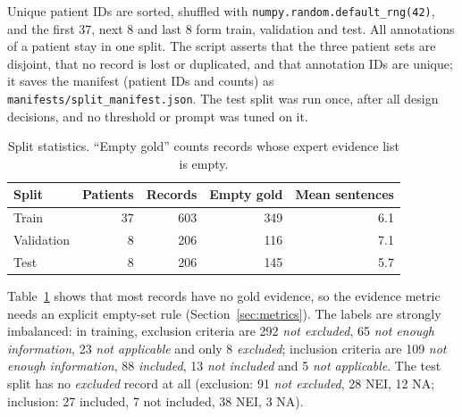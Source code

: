 \documentclass[conference]{IEEEtran}
\begin{document}
Unique patient IDs are sorted, shuffled with \texttt{numpy.random.default\_rng(42)}, and the first 37, next 8 and last 8 form train, validation and test. All annotations of a patient stay in one split. The script asserts that the three patient sets are disjoint, that no record is lost or duplicated, and that annotation IDs are unique; it saves the manifest (patient IDs and counts) as \texttt{manifests/split\_manifest.json}. The test split was run once, after all design decisions, and no threshold or prompt was tuned on it.

\begin{table}[t]
\centering\footnotesize
\caption{Split statistics. ``Empty gold'' counts records whose expert evidence list is empty.}
\label{tab:split}
\begin{tabular}{lrrrr}\toprule
Split & Patients & Records & Empty gold & Mean sentences\\\midrule
Train & 37 & 603 & 349 & 6.1\\
Validation & 8 & 206 & 116 & 7.1\\
Test & 8 & 206 & 145 & 5.7\\\bottomrule
\end{tabular}
\end{table}

Table~\ref{tab:split} shows that most records have no gold evidence, so the evidence metric needs an explicit empty-set rule (Section~\ref{sec:metrics}). The labels are strongly imbalanced: in training, exclusion criteria are 292 \emph{not excluded}, 65 \emph{not enough information}, 23 \emph{not applicable} and only 8 \emph{excluded}; inclusion criteria are 109 \emph{not enough information}, 88 \emph{included}, 13 \emph{not included} and 5 \emph{not applicable}. The test split has no \emph{excluded} record at all (exclusion: 91 \emph{not excluded}, 28 NEI, 12 NA; inclusion: 27 included, 7 not included, 38 NEI, 3 NA).
\end{document}
